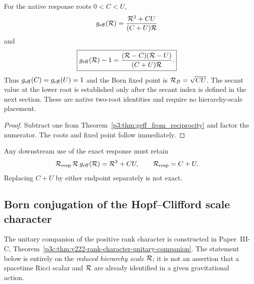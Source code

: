 \documentclass[12pt,a4paper]{article}
\begin{document}
\begin{theorem}
\label{p3:thm:exact-reciprocal-freeze-interface}
For the native response roots \(0<C<U\),
\[
 g_{\mathrm{eff}}(\mathcal R)=\frac{\mathcal R^2+CU}{(C+U)\mathcal R}
\]
and
\begin{equation}
\label{p3:eq:exact-freeze-equation}
 \boxed{g_{\mathrm{eff}}(\mathcal R)-1
 =\frac{(\mathcal R-C)(\mathcal R-U)}{(C+U)\mathcal R}.}
\end{equation}
Thus \(g_{\mathrm{eff}}(C)=g_{\mathrm{eff}}(U)=1\) and the Born fixed point is
\(\mathcal R_B=\sqrt{CU}\).  The secant value at the lower root is established
only after the secant index is defined in the next section.  These are native
two-root identities and require no hierarchy-scale placement.
\end{theorem}

\begin{proof}
Subtract one from Theorem~\ref{p3:thm:geff_from_reciprocity} and factor the
numerator.  The roots and fixed point follow immediately.
\end{proof}

\begin{remark}
\label{p3:rem:forward-transport-normalization}
Any downstream use of the exact response must retain
\[
 \mathcal R_{\rm resp}\,\mathcal R\,g_{\mathrm{eff}}(\mathcal R)=\mathcal R^2+CU,
 \qquad \mathcal R_{\rm resp}=C+U.
\]
Replacing \(C+U\) by either endpoint separately is not exact.
\end{remark}

\newpage


\subsection{Born conjugation of the Hopf--Clifford scale character}
\label{p3d:sec:v222-phase-born-duality}

The unitary companion of the positive rank character is constructed in
Paper~III-C, Theorem~\ref{p3c:thm:v222-rank-character-unitary-companion}.
The statement below is entirely on the \emph{reduced hierarchy scale}
$\mathcal R$; it is not an assertion that a spacetime Ricci scalar and
$\mathcal R$ are already identified in a given gravitational action.
\end{document}
